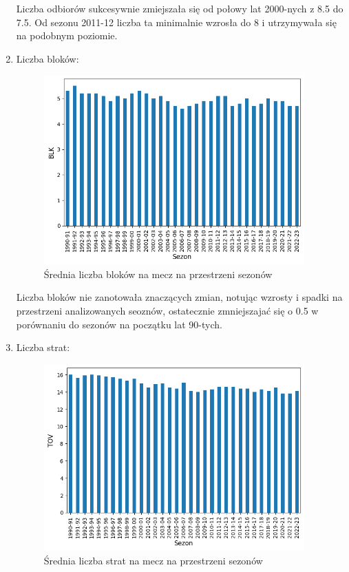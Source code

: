 \documentclass{article}
\begin{document}
\begin{enumerate}
        Liczba odbiorów sukcesywnie zmiejszała się od połowy lat 2000-nych z 8.5 do 7.5. Od sezonu 2011-12 liczba ta minimalnie wzrosła do 8 i utrzymywała się na podobnym poziomie.
 \newpage         
        \item Liczba bloków:
            \begin{figure}[H]
                \centering
                \includegraphics[width=10cm]{wykres_BLK.png}
                \caption{Średnia liczba bloków na mecz na przestrzeni sezonów}
                \label{fig:wykres_BLK}
            \end{figure}

        Liczba bloków nie zanotowała znaczących zmian, notując wzrosty i spadki na przestrzeni analizowanych seoznów, ostatecznie zmniejszajać się o 0.5 w porównaniu do sezonów na początku lat 90-tych.
 \newpage            
        \item Liczba strat:
            \begin{figure}[H]
                \centering
                \includegraphics[width=10cm]{wykres_TOV.png}
                \caption{Średnia liczba strat na mecz na przestrzeni sezonów}
                \label{fig:wykres_TOV}
            \end{figure}


\end{enumerate}
\end{document}

